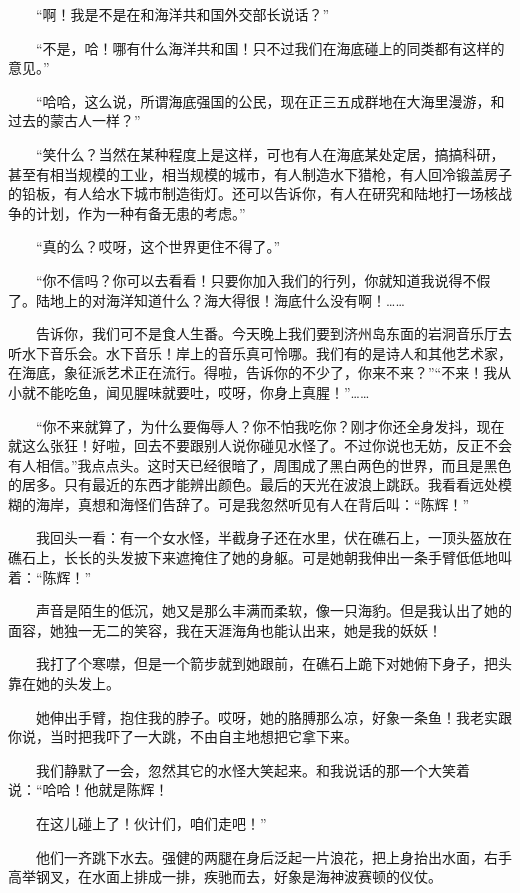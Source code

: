  　　“啊！我是不是在和海洋共和国外交部长说话？” 
 
 　　“不是，哈！哪有什么海洋共和国！只不过我们在海底碰上的同类都有这样的意见。” 
 
 　　“哈哈，这么说，所谓海底强国的公民，现在正三五成群地在大海里漫游，和过去的蒙古人一样？” 
 
 　　“笑什么？当然在某种程度上是这样，可也有人在海底某处定居，搞搞科研，甚至有相当规模的工业，相当规模的城市，有人制造水下猎枪，有人回冷锻盖房子的铅板，有人给水下城市制造街灯。还可以告诉你，有人在研究和陆地打一场核战争的计划，作为一种有备无患的考虑。” 
 
 　　“真的么？哎呀，这个世界更住不得了。” 
 
 　　“你不信吗？你可以去看看！只要你加入我们的行列，你就知道我说得不假了。陆地上的对海洋知道什么？海大得很！海底什么没有啊！…… 
 
 　　告诉你，我们可不是食人生番。今天晚上我们要到济州岛东面的岩洞音乐厅去听水下音乐会。水下音乐！岸上的音乐真可怜哪。我们有的是诗人和其他艺术家，在海底，象征派艺术正在流行。得啦，告诉你的不少了，你来不来？”“不来！我从小就不能吃鱼，闻见腥味就要吐，哎呀，你身上真腥！”…… 
 
 　　“你不来就算了，为什么要侮辱人？你不怕我吃你？刚才你还全身发抖，现在就这么张狂！好啦，回去不要跟别人说你碰见水怪了。不过你说也无妨，反正不会有人相信。”我点点头。这时天已经很暗了，周围成了黑白两色的世界，而且是黑色的居多。只有最近的东西才能辨出颜色。最后的天光在波浪上跳跃。我看看远处模糊的海岸，真想和海怪们告辞了。可是我忽然听见有人在背后叫：“陈辉！” 
 
 　　我回头一看：有一个女水怪，半截身子还在水里，伏在礁石上，一顶头盔放在礁石上，长长的头发披下来遮掩住了她的身躯。可是她朝我伸出一条手臂低低地叫着：“陈辉！” 
 
 　　声音是陌生的低沉，她又是那么丰满而柔软，像一只海豹。但是我认出了她的面容，她独一无二的笑容，我在天涯海角也能认出来，她是我的妖妖！ 
 
 　　我打了个寒噤，但是一个箭步就到她跟前，在礁石上跪下对她俯下身子，把头靠在她的头发上。 
 
 　　她伸出手臂，抱住我的脖子。哎呀，她的胳膊那么凉，好象一条鱼！我老实跟你说，当时把我吓了一大跳，不由自主地想把它拿下来。 
 
 　　我们静默了一会，忽然其它的水怪大笑起来。和我说话的那一个大笑着说：“哈哈！他就是陈辉！ 
 
 　　在这儿碰上了！伙计们，咱们走吧！” 
 
 　　他们一齐跳下水去。强健的两腿在身后泛起一片浪花，把上身抬出水面，右手高举钢叉，在水面上排成一排，疾驰而去，好象是海神波赛顿的仪仗。 
 
